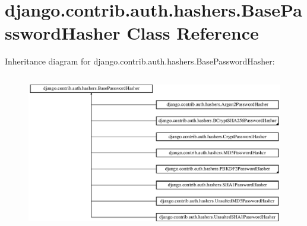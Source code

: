 \hypertarget{classdjango_1_1contrib_1_1auth_1_1hashers_1_1_base_password_hasher}{}\section{django.\+contrib.\+auth.\+hashers.\+Base\+Password\+Hasher Class Reference}
\label{classdjango_1_1contrib_1_1auth_1_1hashers_1_1_base_password_hasher}
Inheritance diagram for django.\+contrib.\+auth.\+hashers.\+Base\+Password\+Hasher\+:\begin{figure}[H]
\begin{center}
\leavevmode
\includegraphics[height=6.923077cm]{classdjango_1_1contrib_1_1auth_1_1hashers_1_1_base_password_hasher}
\end{center}
\end{figure}
